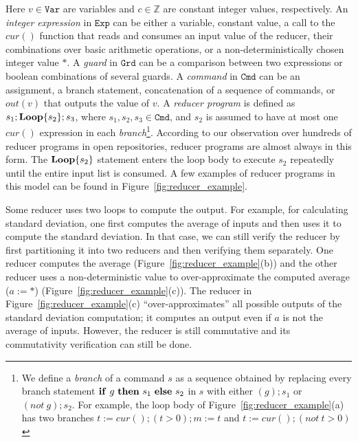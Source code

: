\documentclass{llncs}
\newcommand{\Var}{\mathtt{Var}}
\newcommand{\Exp}{\mathtt{Exp}}
\newcommand{\Cmd}{\mathtt{Cmd}}
\newcommand{\Grd}{\mathtt{Grd}}
\newcommand{\cur}{cur()}
\newcommand{\ite}[3]{
	 \ifmmode
	 \mathbf{if}\ #1 \ \mathbf{then}\ #2\  \mathbf{else}\ #3
	 \else
	 \textbf{if}\ #1 \ \textbf{then}\ #2\  \textbf{else}\ #3
	 \fi}
\newcommand{\rloop}{
	\ifmmode
	\mathbf{Loop}
	\else
	\textbf{Loop}
	\fi}
\newcommand{\Z}{\mathbb{Z}}
\begin{document}
Here $v\in \Var$ are variables and $c \in \Z$ are constant integer values, respectively. An \emph{integer expression} in $\Exp$ can be either a variable, constant value, a call to the $\cur$ function that reads and consumes an input value of the reducer, their combinations over basic arithmetic operations, or a non-deterministically chosen integer value $*$.
A \emph{guard} in $\Grd$ can be a comparison between two expressions or boolean combinations of several guards. A \emph{command} in $\Cmd$ can be an assignment, a branch statement, concatenation of a sequence of commands, or $out(v)$ that outputs the value of $v$.
A \emph{reducer program} is defined as $s_1;\rloop\{s_2\};s_3$, where $s_1,s_2,s_3 \in \Cmd$, and $s_2$ is assumed to have at most one $\cur$ expression in each \emph{branch}\footnote{We define a \emph{branch} of a command $s$ as a sequence obtained by replacing every branch statement $\ite{g}{s_1}{s_2}$ in $s$ with either $(g); s_1$ or $(not\ g) ;s_2$. For example, the loop body of Figure~\ref{fig:reducer_example}(a) has two branches $t:=\cur; (t>0); m:=t$ and $t:=\cur;(not\ t>0)$ }. According to our observation over hundreds  of reducer programs in open repositories, reducer programs are almost always in this form. The $\rloop\{s_2\}$ statement enters the loop body to execute $s_2$ repeatedly until the entire input list is consumed. A few examples of reducer programs in this model can be found in Figure~\ref{fig:reducer_example}. 


Some reducer uses two loops to compute the output. For example, for calculating standard deviation, one first computes the average of inputs and then uses it to compute the standard deviation. In that case, we can still verify the reducer by first partitioning it into two reducers and then verifying them separately. One reducer computes the average (Figure~\ref{fig:reducer_example}(b)) and the other reducer uses a non-deterministic value to over-approximate the computed average ($a := *$) (Figure~\ref{fig:reducer_example}(c)). The reducer in Figure~\ref{fig:reducer_example}(c) ``over-approximates''  all possible outputs of the standard deviation computation; it computes an output even if $a$ is not the average of inputs. However, the reducer is still commutative and its commutativity verification can still be done.
\end{document}

